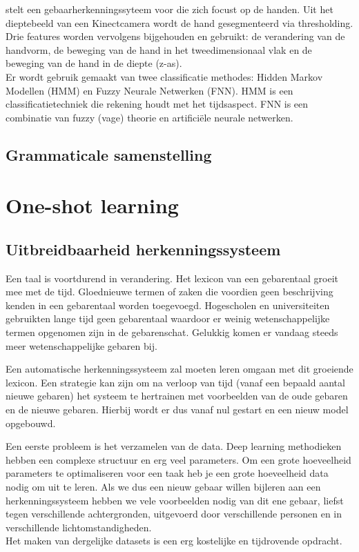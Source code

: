 \npar \cite{gesture-FNN-HMM} stelt een gebaarherkenningssyteem voor die zich focust op de handen. Uit het dieptebeeld van een Kinectcamera wordt de hand gesegmenteerd via thresholding. Drie features worden vervolgens bijgehouden en gebruikt: de verandering van de handvorm, de beweging van de hand in het tweedimensionaal vlak en de beweging van de hand in de diepte (z-as).
\\Er wordt gebruik gemaakt van twee classificatie methodes: Hidden Markov Modellen (HMM) en Fuzzy Neurale Netwerken (FNN). HMM is een classificatietechniek die rekening houdt met het tijdsaspect. FNN is een combinatie van fuzzy (vage) theorie en artifici\"ele neurale netwerken.

\subsection{Grammaticale samenstelling}

%

\section{One-shot learning}

\subsection{Uitbreidbaarheid herkenningssysteem}
Een taal is voortdurend in verandering.
Het lexicon van een gebarentaal groeit mee met de tijd. Gloednieuwe termen of zaken die voordien geen beschrijving kenden in een gebarentaal worden toegevoegd. Hogescholen en universiteiten gebruikten lange tijd geen gebarentaal waardoor er weinig wetenschappelijke termen opgenomen zijn in de gebarenschat. Gelukkig komen er vandaag steeds meer wetenschappelijke gebaren bij.

\npar Een automatische herkenningssysteem zal moeten leren omgaan met dit groeiende lexicon. Een strategie kan zijn om na verloop van tijd (vanaf een bepaald aantal nieuwe gebaren) het systeem te hertrainen met voorbeelden van de oude gebaren en de nieuwe gebaren. Hierbij wordt er dus vanaf nul gestart en een nieuw model opgebouwd.

\npar Een eerste probleem is het verzamelen van de data. Deep learning methodieken hebben een complexe structuur en erg veel parameters. Om een grote hoeveelheid parameters te optimaliseren voor een taak heb je een grote hoeveelheid data nodig om uit te leren. Als we dus een nieuw gebaar willen bijleren aan een herkenningssysteem hebben we vele voorbeelden nodig van dit ene gebaar, liefst tegen verschillende achtergronden, uitgevoerd door verschillende personen en in verschillende lichtomstandigheden.
\\ Het maken van dergelijke datasets is een erg kostelijke en tijdrovende opdracht.

